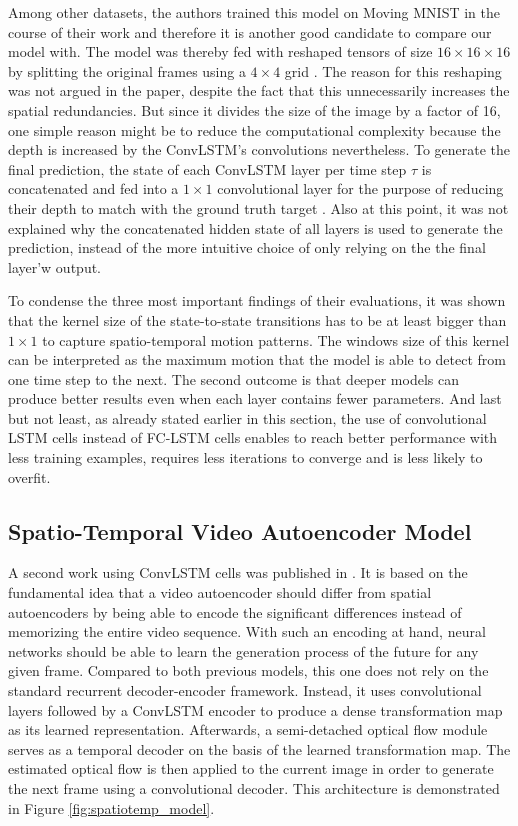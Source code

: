 Among other datasets, the authors trained this model on Moving MNIST in the course of their work and therefore it is another good candidate to compare our model with. The model was thereby fed with reshaped tensors of size $16 \times 16 \times 16$ by splitting the original frames using a $4 \times 4$ grid \parencite[p. 6]{conv_lstm_nowcasting}. The reason for this reshaping was not argued in the paper, despite the fact that this unnecessarily increases the spatial redundancies. But since it divides the size of the image by a factor of 16, one simple reason might be to reduce the computational complexity because the depth is increased by the ConvLSTM's convolutions nevertheless. To generate the final prediction, the state of each ConvLSTM layer per time step $\tau$ is concatenated and fed into a $1 \times 1$ convolutional layer for the purpose of reducing their depth to match with the ground truth target \parencite[p. 4]{conv_lstm_nowcasting}. Also at this point, it was not explained why the concatenated hidden state of all layers is used to generate the prediction, instead of the more intuitive choice of only relying on the the final layer'w output.

To condense the three most important findings of their evaluations, it was shown that the kernel size of the state-to-state transitions has to be at least bigger than $1 \times 1$ to capture spatio-temporal motion patterns. The windows size of this kernel can be interpreted as the maximum motion that the model is able to detect from one time step to the next. The second outcome is that deeper models can produce better results even when each layer contains fewer parameters. And last but not least, as already stated earlier in this section, the use of convolutional LSTM cells instead of FC-LSTM cells enables to reach better performance with less training examples, requires less iterations to converge and is less likely to overfit.


\subsection{Spatio-Temporal Video Autoencoder Model}

A second work using ConvLSTM cells was published in \parencite{spat_temp_video_autoenc}. It is based on the fundamental idea that a video autoencoder should differ from spatial autoencoders by being able to encode the significant differences instead of memorizing the entire video sequence. With such an encoding at hand, neural networks should be able to learn the generation process of the future for any given frame. Compared to both previous models, this one does not rely on the standard recurrent decoder-encoder framework. Instead, it uses convolutional layers followed by a ConvLSTM encoder to produce a dense transformation map as its learned representation. Afterwards, a semi-detached optical flow module serves as a temporal decoder on the basis of the learned transformation map. The estimated optical flow is then applied to the current image in order to generate the next frame using a convolutional decoder. This architecture is demonstrated in Figure \ref{fig:spatiotemp_model}.

